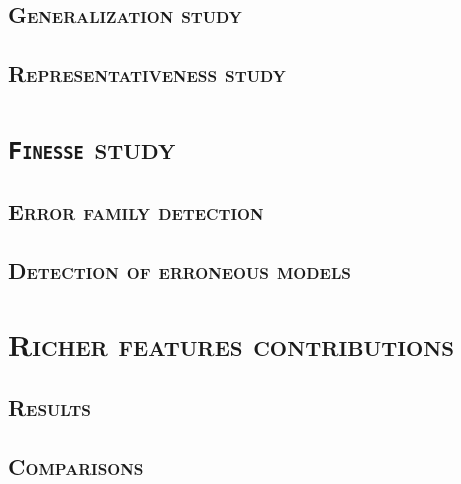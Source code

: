         \subsubsection{\textsc{}}
    \subsection{\textsc{Generalization study}}
        \subsubsection{\textsc{}}
        \subsubsection{\textsc{}}
        \subsubsection{\textsc{}}
    \subsection{\textsc{Representativeness study}}
        \subsubsection{\textsc{}}

\section{\textsc{\texttt{Finesse} study}}
    \subsection{\textsc{Error family detection}}
    \subsection{\textsc{Detection of erroneous models}}

\section{\textsc{Richer features contributions}}
    \subsection{\textsc{Results}}
    \subsection{\textsc{Comparisons}}
